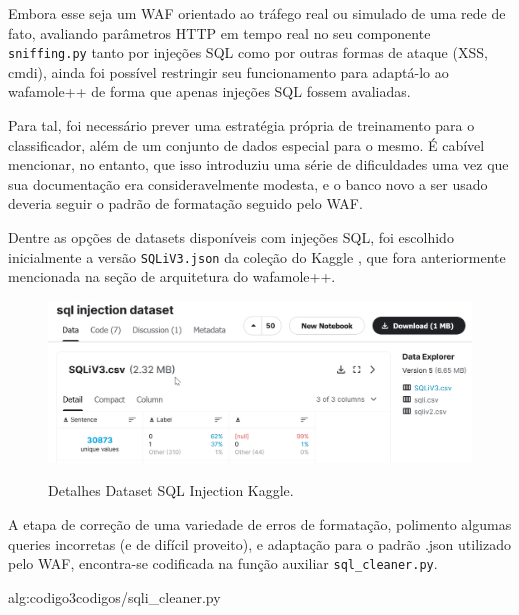 Embora esse seja um WAF orientado ao tráfego real ou simulado de uma rede de fato, avaliando parâmetros HTTP em tempo real no seu componente \verb+sniffing.py+ tanto por injeções SQL como por outras formas de ataque (XSS, cmdi), ainda foi possível restringir seu funcionamento para adaptá-lo ao wafamole++ de forma que apenas injeções SQL fossem avaliadas.

Para tal, foi necessário prever uma estratégia própria de treinamento para o classificador, além de um conjunto de dados especial para o mesmo. É cabível mencionar, no entanto, que isso introduziu uma série de dificuldades uma vez que sua documentação era consideravelmente modesta, e o banco novo a ser usado deveria seguir o padrão de formatação seguido pelo WAF.

Dentre as opções de datasets disponíveis com injeções SQL, foi escolhido inicialmente a versão \verb+SQLiV3.json+ da coleção do Kaggle \cite{kaggle_dataset_sql}, que fora anteriormente mencionada na seção de arquitetura do wafamole++.

\begin{figure}[ht]
    \centering
    \caption{Detalhes Dataset SQL Injection Kaggle.}
    \includegraphics[width=16cm]{figuras/sqlInjectionDataset.png} 
    \label{fig:internet} 
\end{figure}

A etapa de correção de uma variedade de erros de formatação, polimento algumas queries incorretas (e de difícil proveito), e adaptação para o padrão .json utilizado pelo WAF, encontra-se codificada na função auxiliar \verb+sql_cleaner.py+.


\label{sec:codigos:sqli_cleaner}
 {alg:codigo3}{codigos/sqli_cleaner.py}
\bigskip


